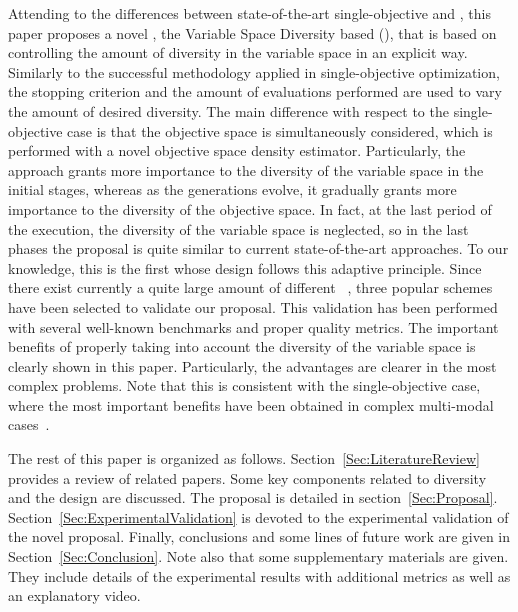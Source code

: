 Attending to the differences between state-of-the-art single-objective \EAS{} and \MOEAS{}, 
this paper proposes a novel \MOEA{}, the Variable Space Diversity based \MOEA{} (\VSDMOEA{}), 
that is based on controlling the amount of diversity in the variable space in an explicit way.
%
Similarly to the successful methodology applied in single-objective optimization, the stopping criterion and the 
amount of evaluations performed are used to vary the amount of desired diversity.
%
The main difference with respect to the single-objective case is that the objective space is simultaneously considered, which
is performed with a novel objective space density estimator.
%
Particularly, the approach grants more importance to the diversity of the variable space in the initial stages, whereas 
as the generations evolve, it gradually grants more importance to the diversity of the objective space.
%
In fact, at the last period of the execution, the diversity of the variable space is neglected, so in the last phases the proposal 
is quite similar to current state-of-the-art approaches.
%
To our knowledge, this is the first \MOEA{} whose design follows this adaptive principle.
%
Since there exist currently a quite large amount of different \MOEAS{}~\cite{Joel:MOEA_APPLICATIONS_BOOK_KCTAN}, 
three popular schemes have been selected to validate our proposal.
%
%
%
%
%
This validation has been performed with several well-known benchmarks and proper quality metrics.
%
The important benefits of properly taking into account the diversity of the variable space is
clearly shown in this paper.
%
Particularly, the advantages are clearer in the most complex problems.
%
Note that this is consistent with the single-objective case, where the most important benefits have been obtained
in complex multi-modal cases~\cite{Segura:17}.

The rest of this paper is organized as follows. 
%
Section~\ref{Sec:LiteratureReview} provides a review of related papers.
%
Some key components related to diversity and the \VSDMOEA{} design are discussed.
%
The \VSDMOEA{} proposal is detailed in section~\ref{Sec:Proposal}.
%
Section~\ref{Sec:ExperimentalValidation} is devoted to the experimental validation of the novel proposal.
%
Finally, conclusions and some lines of future work are given in Section~\ref{Sec:Conclusion}.
%
Note also that some supplementary materials are given.
%
They include details of the experimental results with additional metrics as well as an explanatory video.
